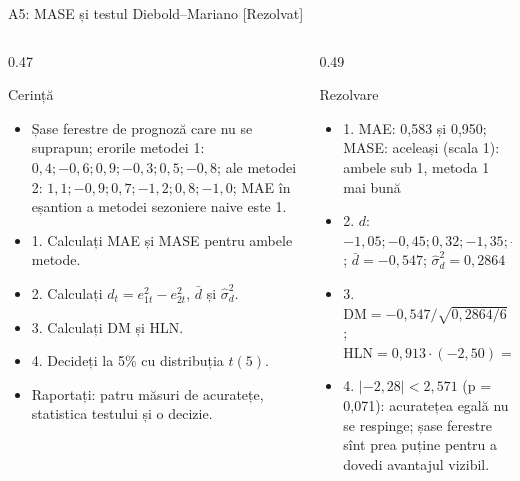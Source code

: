 \begin{frame}{A5: MASE și testul Diebold--Mariano [Rezolvat]}
\itemsize{\scriptsize}
\begin{columns}[T]
\begin{column}{0.47\textwidth}
\begin{block}{Cerință}
\begin{itemize}
    \item Șase ferestre de prognoză care nu se suprapun; erorile metodei 1: $0{,}4; -0{,}6; 0{,}9; -0{,}3; 0{,}5; -0{,}8$; ale metodei 2: $1{,}1; -0{,}9; 0{,}7; -1{,}2; 0{,}8; -1{,}0$; MAE în eșantion a metodei sezoniere naive este 1.
    \item 1. Calculați MAE și MASE pentru ambele metode.
    \item 2. Calculați $d_t = e_{1t}^2 - e_{2t}^2$, $\bar d$ și $\hat\sigma_d^2$.
    \item 3. Calculați DM și HLN.
    \item 4. Decideți la 5\% cu distribuția $t(5)$.
    \item Raportați: patru măsuri de acuratețe, statistica testului și o decizie.
\end{itemize}
\end{block}
\end{column}
\begin{column}{0.49\textwidth}
\begin{exampleblock}{Rezolvare}
\begin{itemize}
    \item 1. MAE: 0{,}583 și 0{,}950; MASE: aceleași (scala 1): ambele sub 1, metoda 1 mai bună
    \item 2. $d$: $-1{,}05; -0{,}45; 0{,}32; -1{,}35; -0{,}39; -0{,}36$; $\bar d = -0{,}547$; $\hat\sigma_d^2 = 0{,}2864$
    \item 3. $\mathrm{DM} = -0{,}547/\sqrt{0{,}2864/6} = -2{,}50$; $\mathrm{HLN} = 0{,}913 \cdot (-2{,}50) = -2{,}28$
    \item 4. $|-2{,}28| < 2{,}571$ (p = 0{,}071): acuratețea egală nu se respinge; șase ferestre sînt prea puține pentru a dovedi avantajul vizibil.
\end{itemize}
\end{exampleblock}
\end{column}
\end{columns}
\end{frame}


